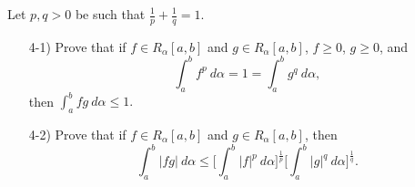 \documentclass[a4paper]{article}
\begin{document}
\begin{problem}
    Let \( p,q > 0  \) be such that \( \frac{ 1 }{ p }  + \frac{ 1 }{ q }  = 1  \).
    \begin{enumerate}
        \item[4-1)] Prove that if \( f \in {R}_{\alpha}[a,b] \) and \( g \in {R}_{\alpha}[a,b]  \), \( f \geq 0  \), \( g \geq 0  \), and 
            \[  \int_{ a }^{ b } f^{p} \ d \alpha = 1 = \int_{ a }^{ b } g^{q} \ d \alpha, \]
            then \( \displaystyle \int_{ a }^{ b }  fg  \ d \alpha \leq 1.   \)
        \item[4-2)] Prove that if \( f \in {R}_{\alpha}[a,b] \) and \( g \in {R}_{\alpha}[a,b] \), then 
            \[  \int_{ a }^{ b } | fg |  \ d \alpha \leq \Big[ \int_{ a }^{ b } | f |^{p}    \ d \alpha \Big]^{\frac{ 1 }{ p } } \Big[ \int_{ a }^{ b }  | g |^{q}  \ d \alpha \Big]^{\frac{ 1 }{ q } }. \]
    \end{enumerate}
\end{problem}
\end{document}

